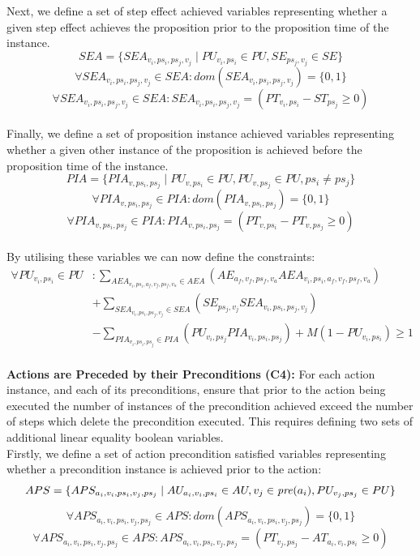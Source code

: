 Next, we define a set of step effect achieved variables representing whether a given step effect achieves the proposition prior to the proposition time of the instance.
\[SEA=\{SEA_{v_i,ps_i,ps_j,v_j}\mid PU_{v_i,ps_i}\in PU,SE_{ps_j,v_j}\in SE\}\]
\[ \forall SEA_{v_i,ps_i,ps_j,v_j}\in SEA:\mathit{dom}(SEA_{v_i,ps_i,ps_j,v_j})=\{0,1\}\]
\[ \forall SEA_{v_i,ps_i,ps_j,v_j}\in SEA:SEA_{v_i,ps_i,ps_j,v_j}=(PT_{v_i,ps_i}-ST_{ps_j}\geq 0)\]\\


Finally, we define a set of proposition instance achieved variables representing whether a given other instance of the proposition is achieved before the proposition time of the instance.
\[PIA=\{PIA_{v,ps_i,ps_j}\mid PU_{v,ps_i}\in PU,PU_{v,ps_j}\in PU,ps_i\neq ps_j\}\]
\[ \forall PIA_{v,ps_i,ps_j}\in PIA:\mathit{dom}(PIA_{v,ps_i,ps_j})=\{0,1\}\]
\[ \forall PIA_{v,ps_i,ps_j}\in PIA:PIA_{v,ps_i,ps_j}=(PT_{v,ps_i}-PT_{v,ps_j}\geq 0)\]\\


By utilising these variables we can now define the constraints:
\begin{align*}
\forall PU_{v_i,ps_i}\in PU&:\sum_{AEA_{v_i,ps_i,a_f,v_f,ps_f,v_a}\in AEA}(AE_{a_f,v_f,ps_f,v_a}AEA_{v_i,ps_i,a_f,v_f,ps_f,v_a})\\&+\sum_{SEA_{v_i,ps_i,ps_j,v_j}\in SEA}(SE_{ps_j,v_j}SEA_{v_i,ps_i,ps_j,v_j})\\&-\sum_{PIA_{v_i,ps_i,ps_j}\in PIA}(PU_{v_i,ps_j}PIA_{v_i,ps_i,ps_j})+M(1-PU_{v_i,ps_i})\geq 1
\end{align*}\\


\textbf{Actions are Preceded by their Preconditions (C4):} For each action instance, and each of its preconditions, ensure that prior to the action being executed the number of instances of the precondition achieved exceed the number of steps which delete the precondition executed. This requires defining two sets of additional linear equality boolean variables.\\


Firstly, we define a set of action precondition satisfied variables representing whether a precondition instance is achieved prior to the action:
\[APS=\{APS_{a_i,v_i,ps_i,v_j,ps_j}\mid AU_{a_i,v_i,ps_i}\in AU, v_j\in\mathit{pre} (a_i), PU_{v_j,ps_j}\in PU\}\]
\[\forall APS_{a_i,v_i,ps_i,v_j,ps_j}\in APS:\mathit{dom}(APS_{a_i,v_i,ps_i,v_j,ps_j})=\{0,1\}\]
\[\forall APS_{a_i,v_i,ps_i,v_j,ps_j}\in APS: APS_{a_i,v_i,ps_i,v_j,ps_j}=(PT_{v_j,ps_j}-AT_{a_i,v_i,ps_i}\geq 0)\]\\


